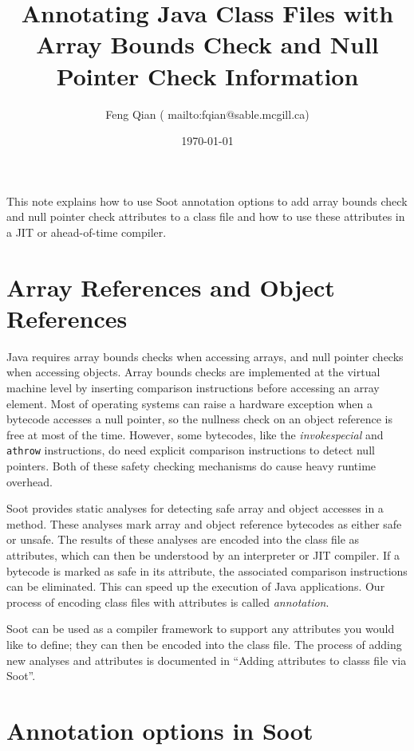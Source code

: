 \documentclass{article}
\begin{document}
\title{Annotating Java Class Files with \\
       Array Bounds Check and Null Pointer Check Information}
\author{Feng Qian (
        {mailto:fqian@sable.mcgill.ca})}
\date{\today}
\maketitle

This note explains how to use Soot annotation options to add array
bounds check and null pointer check attributes to a class file and
how to use these attributes in a JIT or ahead-of-time compiler.

\section{Array References and Object References}
Java requires array bounds checks when accessing arrays, and null
pointer checks when accessing objects.  Array bounds checks are
implemented at the virtual machine level by inserting comparison
instructions before accessing an array element.  Most of operating systems
can raise a hardware exception when a bytecode accesses a null
pointer, so the nullness check on an object reference is 
free at most of the time.  However, some bytecodes, like the {\it
invokespecial} and {\tt athrow} instructions, do need explicit comparison
instructions to detect null pointers.  Both of these safety checking
mechanisms do cause heavy runtime overhead.

Soot provides static analyses for detecting safe array and object
accesses in a method.  These analyses mark array and object reference bytecodes as
either safe or unsafe.  The results of these analyses are encoded into the
class file as attributes, which can then be understood by an
interpreter or JIT compiler. If a bytecode is marked as safe in its
attribute, the associated comparison instructions can be eliminated.
This can speed up the execution of Java applications. Our process of
encoding class files with attributes is called {\em annotation}.

Soot can be used as a compiler framework to support any attributes you
would like to define; they can then be encoded into the class file.
The process of adding new analyses and attributes is documented in
``Adding attributes to classs file via Soot''.

\section{Annotation options in Soot}
\end{document}

